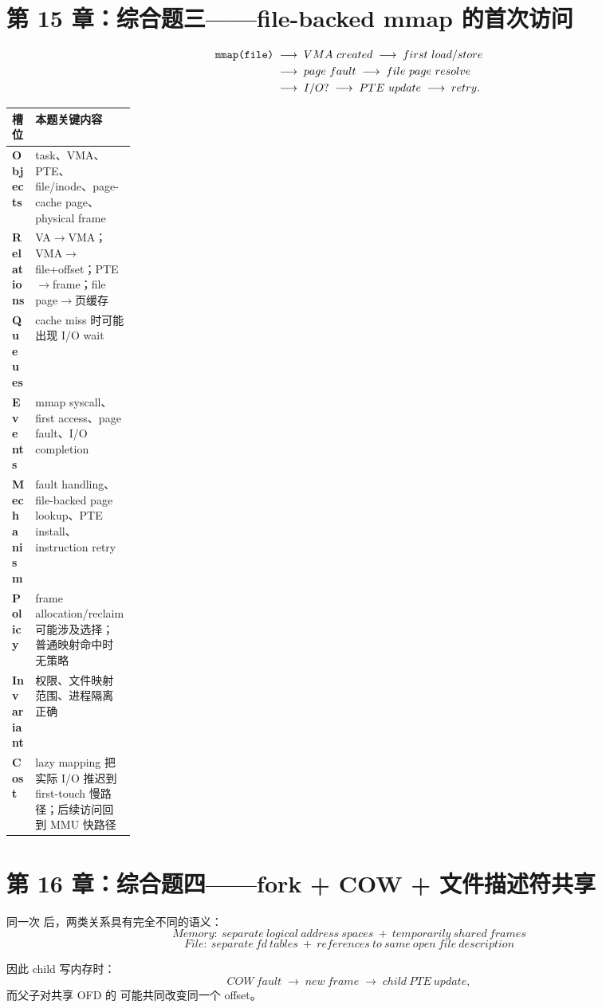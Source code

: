 \documentclass[11pt,a4paper]{ctexart}
\newcommand{\code}[1]{\texttt{\detokenize{#1}}}
\newcommand{\arr}{\;\longrightarrow\;}
\begin{document}
\section{第 15 章：综合题三——file-backed mmap 的首次访问}

\[
\begin{aligned}
\code{mmap(file)}&\arr VMA\ created\arr first\ load/store\\
&\arr page\ fault\arr file\ page\ resolve\\
&\arr I/O?\arr PTE\ update\arr retry.
\end{aligned}
\]

\begin{center}
\small
\begin{tabularx}{\linewidth}{>{\bfseries}p{0.18\linewidth} X}
\toprule
槽位 & 本题关键内容 \\
\midrule
Objects & task、VMA、PTE、file/inode、page-cache page、physical frame \\
Relations & VA$\to$VMA；VMA$\to$file+offset；PTE$\to$frame；file page$\to$页缓存 \\
Queues & cache miss 时可能出现 I/O wait \\
Events & mmap syscall、first access、page fault、I/O completion \\
Mechanism & fault handling、file-backed page lookup、PTE install、instruction retry \\
Policy & frame allocation/reclaim 可能涉及选择；普通映射命中时无策略 \\
Invariant & 权限、文件映射范围、进程隔离正确 \\
Cost & lazy mapping 把实际 I/O 推迟到 first-touch 慢路径；后续访问回到 MMU 快路径 \\
\bottomrule
\end{tabularx}
\end{center}

\section{第 16 章：综合题四——fork + COW + 文件描述符共享}

同一次 \code{fork()} 后，两类关系具有完全不同的语义：
\[
\boxed{Memory:\ separate\ logical\ address\ spaces\ +\ temporarily\ shared\ frames}
\]
\[
\boxed{File:\ separate\ fd\ tables\ +\ references\ to\ same\ open\ file\ description}
\]

因此 child 写内存时：
\[
COW\ fault\arr new\ frame\arr child\ PTE\ update,
\]
而父子对共享 OFD 的 \code{read/lseek} 可能共同改变同一个 offset。
\end{document}
